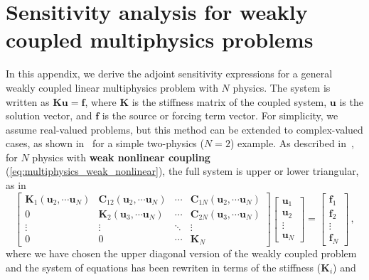 \section{Sensitivity analysis for weakly coupled multiphysics problems}\label{app:appendix1}
In this appendix, we derive the adjoint sensitivity expressions for a general weakly coupled linear multiphysics
 problem with $N$ physics. The system is written as $\mathbf{K}\mathbf{u} = \mathbf{f}$, where $\mathbf{K}$ is 
 the stiffness matrix of the coupled system, $\mathbf{u}$ is the solution vector, and $\mathbf{f}$ is the source or forcing term vector. For 
 simplicity, we assume real-valued problems, but this method can be extended to complex-valued cases, as shown
  in~\cite{ownpub0} for a simple two-physics ($N=2$) example. As described in~, 
  for $N$ physics with \textbf{weak nonlinear coupling} (\eqref{eq:multiphysics_weak_nonlinear}), the full 
  system is upper or lower triangular, as in
\begin{equation} \label{eq:app_multiphysics_weak}
    \begin{bmatrix}
        \mathbf{K}_1(\mathbf{u}_2, \cdots \mathbf{u}_N)    & \mathbf{C}_{12} (\mathbf{u}_2, \cdots \mathbf{u}_N)& \cdots & \mathbf{C}_{1N}(\mathbf{u}_2, \cdots \mathbf{u}_N) \\
        0 & \mathbf{K}_2 (\mathbf{u}_3, \cdots \mathbf{u}_N)   & \cdots & \mathbf{C}_{2N} (\mathbf{u}_3, \cdots \mathbf{u}_N)\\
        \vdots          & \vdots          & \ddots & \vdots          \\
        0& 0 & \cdots & \mathbf{K}_N
    \end{bmatrix}
    \begin{bmatrix}
        \mathbf{u}_1 \\
        \mathbf{u}_2 \\
        \vdots       \\
        \mathbf{u}_N
    \end{bmatrix}
    =
    \begin{bmatrix}
        \mathbf{f}_1\\
        \mathbf{f}_2\\
        \vdots       \\
        \mathbf{f}_N
    \end{bmatrix}\,,
\end{equation}
where we have chosen the upper diagonal version of the weakly coupled problem and the system of equations has been rewriten in terms of the stiffness ($\mathbf{K}_i$) and 
